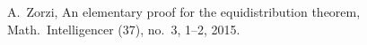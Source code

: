 
% 
% 

\begin{thebibliography}{10}

A.~Zorzi,
An elementary proof for the equidistribution theorem,
Math.\ Intelligencer (37), no.\ 3, 1--2,
2015.

\end{thebibliography}

